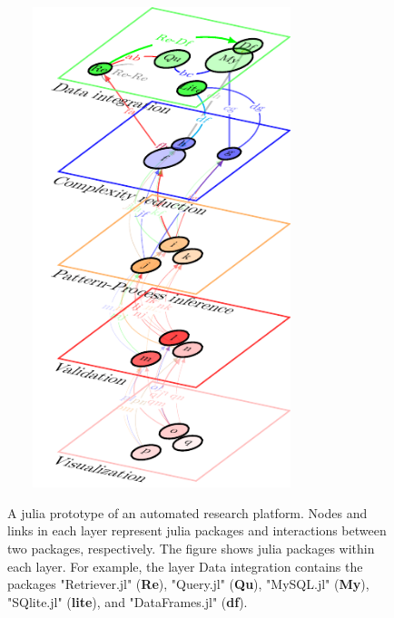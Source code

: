 \documentclass[english,12pt]{article}
\begin{document}
\newpage
\begin{figure}
\begin{center}
\hspace{-0.5 in}\includegraphics[width=9cm,height=14cm]{Figure2.pdf}\\
\end{center}
\caption{A julia prototype of an automated research platform. Nodes
  and links in each layer represent julia packages and interactions
  between two packages, respectively. The figure shows julia packages
  within each layer. For example, the layer Data integration contains
  the packages "Retriever.jl" ({\bf Re}), "Query.jl" ({\bf Qu}),
  "MySQL.jl" ({\bf My}), "SQlite.jl" ({\bf lite}), and "DataFrames.jl"
  ({\bf df}). }



\label{}
\end{figure}
\end{document}

